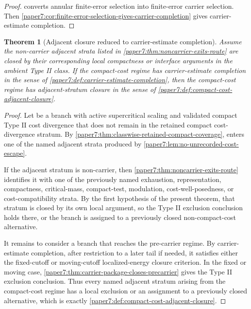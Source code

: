 \documentclass[11pt]{amsart}
\def\({}%
\def\){}%
\theoremstyle{plain}
\newtheorem{theorem}{Theorem}[section]
\theoremstyle{definition}
\theoremstyle{remark}
\begin{document}
\begin{proof}
 converts annular
finite-error selection into finite-error carrier selection.  Then
\cref{paper7:cor:finite-error-selection-gives-carrier-completion} gives
carrier-estimate completion.
\end{proof}

\begin{theorem}[Adjacent closure reduced to carrier-estimate completion]
\label{paper7:thm:adjacent-closure-reduced-to-carrier-completion}
Assume the non-carrier adjacent strata listed in
\cref{paper7:thm:noncarrier-exits-route} are closed by their corresponding
local compactness or interface arguments in the ambient Type II class.  If the
compact-cost regime has carrier-estimate completion in the sense of
\cref{paper7:def:carrier-estimate-completion}, then the compact-cost regime
has adjacent-stratum closure in the sense of
\cref{paper7:def:compact-cost-adjacent-closure}.
\end{theorem}

\begin{proof}
Let \(\omega\) be a branch with active supercritical scaling and validated
compact Type II cost divergence that does not remain in the retained compact
cost-divergence stratum.  By
\cref{paper7:thm:classwise-retained-compact-coverage}, \(\omega\) enters one
of the named adjacent strata produced by
\cref{paper7:lem:no-unrecorded-cost-escape}.
\par
If the adjacent stratum is non-carrier, then
\cref{paper7:thm:noncarrier-exits-route} identifies it with one of the
previously named exhaustion, representation, compactness, critical-mass,
compact-test, modulation, cost-well-posedness, or cost-compatibility strata.
By the first hypothesis of the present theorem, that stratum is closed by its
own local argument, so the Type II exclusion conclusion holds there, or the
branch is assigned to a previously closed non-compact-cost alternative.
\par
It remains to consider a branch that reaches the pre-carrier regime.  By
carrier-estimate completion, after restriction to a later tail if needed, it
satisfies either the fixed-cutoff or moving-cutoff localized-energy closure criterion.  In
the fixed or moving case,
\cref{paper7:thm:carrier-package-closes-precarrier} gives the Type II
exclusion conclusion.  Thus every named adjacent stratum arising from the
compact-cost regime has a local exclusion or an assignment to a previously closed
alternative, which is exactly
\cref{paper7:def:compact-cost-adjacent-closure}.
\end{proof}
\end{document}
